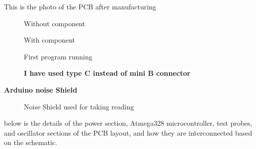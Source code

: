 \documentclass[a4paper,11pt]{article}%
\begin{document}
This is the photo of the PCB after manufacturing\\

\begin{figure}[H]
	\centering
	\caption{Without component}
	\label{top}
\end{figure}

\begin{figure}[H]
	\centering
	\caption{With component}
\end{figure}

\begin{figure}[H]
	\centering
	\caption{First program running}
\end{figure}


\begin{figure}[H]
	\centering
	\caption{\textbf{I have used type C instead of mini B connector}}
\end{figure}


\textbf{Arduino noise Shield}

\begin{figure}[H]
	\centering
	\caption{Noise Shield used for taking reading}
\end{figure}



below is the details of the power section, Atmega328 microcontroller, test probes, and oscillator sections of the PCB layout, and how they are interconnected based on the schematic.
\end{document}
